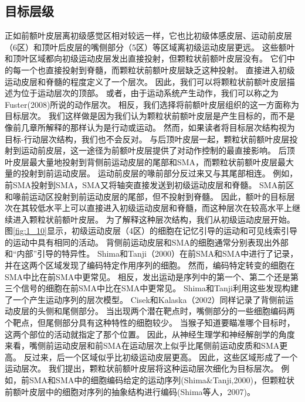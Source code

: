 \subsection{目标层级}
\par
正如前额叶皮层离初级感觉区相对较远一样，它也比初级体感皮层、运动前皮层（6区）和顶叶后皮层的嘴侧部分（5区）等区域离初级运动皮层更远。
这些额叶和顶叶区域都向初级运动皮层发出直接投射，但颗粒状前额叶皮层没有\cite{jones1970anatomical,lu1994interconnections}。
它们中的每一个也直接投射到脊髓，而颗粒状前额叶皮层缺乏这种投射\cite{murray1991contributions}。
直接进入初级运动皮层和脊髓的程度定义了一个层次。
因此，我们可以将颗粒状前额叶皮层描述为位于运动层次的顶部。
或者，由于运动系统产生动作，我们可以称之为Fuster(2008)所说的动作层次。
相反，我们选择将前额叶皮层组织的这一方面称为目标层次。
我们这样做是因为我们认为颗粒状前额叶皮层是产生目标的，而不是像前几章所解释的那样认为是行动或运动。
然而，如果读者将目标层次结构视为目标-行动层次结构，我们也不会反对。
与后顶叶皮层一起，颗粒状前额叶皮层投射到运动前皮层，这一途径为前额叶皮层提供了对动作控制的最直接影响。
后顶叶皮层最大量地投射到背侧前运动皮层的尾部和SMA，而颗粒状前额叶皮层最大量的投射到前运动皮层\cite{rizzolatti2001cortical,luppino2003prefrontal}。
运动前皮层的喙前部分反过来又与其尾部相连。
例如，前SMA投射到SMA，SMA又将轴突直接发送到初级运动皮层\cite{luppino1993corticocortical}和脊髓\cite{murray1981organization}。
SMA前区和喙前运动区投射到前运动皮层的尾部，但不投射到脊髓\cite{he1995topographic}。
因此，额叶的目标层次在其较低水平上可以直接进入初级运动皮层和脊髓，而这种层次在较高水平上继续进入颗粒状前额叶皮层。
为了解释这种层次结构，我们从初级运动皮层开始。
图\ref{fig:1_10}显示，初级运动皮层（4区）的细胞在记忆引导的运动和可见线索引导的运动中具有相同的活动。
背侧前运动皮层和SMA的细胞通常分别表现出外部和“内部”引导的特异性。
Shima和Tanji（2000）在前SMA和SMA中进行了记录，并在这两个区域发现了编码特定作用序列的细胞。
然而，编码特定转变的细胞在SMA中比在前SMA中更常见。
相反，发出运动是序列中的第一个、第二个还是第三个信号的细胞在前SMA中比在SMA中更常见。
Shima和Tanji利用这些发现构建了一个产生运动序列的层次模型。
Cisek和Kalaska（2002）同样记录了背侧前运动皮层的头侧和尾侧部分。
当出现两个潜在靶点时，嘴侧部分的一些细胞编码两个靶点，但尾侧部分具有这种特性的细胞较少。
当猴子知道要瞄准哪个目标时，这两个部位的活动就指定了那个位置。
因此，从神经生理学和神经解剖学的角度来看，嘴侧前运动皮层和前SMA在运动层次上似乎比尾侧前运动皮质和SMA更高。
反过来，后一个区域似乎比初级运动皮层更高。
因此，这些区域形成了一个运动层次。
我们提出，颗粒状前额叶皮层将这种运动层次细化为目标层次。
例如，前SMA和SMA中的细胞编码给定的运动序列(Shima\&Tanji,2000)，但颗粒状前额叶皮层中的细胞对序列的抽象结构进行编码(Shima等人，2007)。
